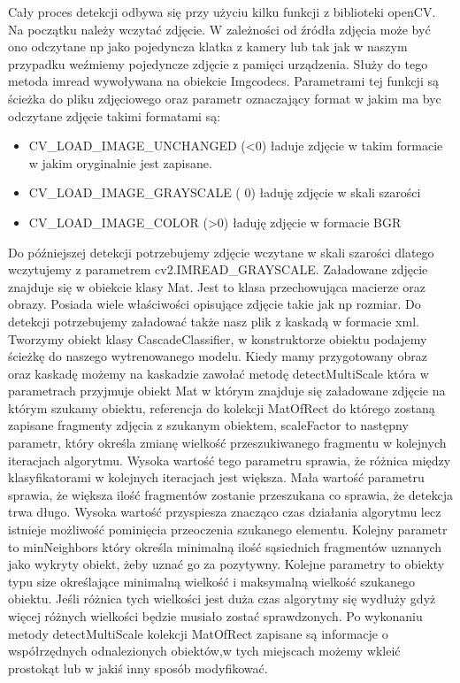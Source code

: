 \documentclass{article}
\numberwithin{equation}{section}
\begin{document}
Cały proces detekcji odbywa się przy użyciu kilku funkcji z biblioteki openCV. Na początku należy wczytać zdjęcie. W zależności od źródła zdjęcia może być ono odczytane np jako pojedyncza klatka z kamery lub tak jak w naszym przypadku weźmiemy pojedyncze zdjęcie z pamięci urządzenia. Służy do tego metoda imread wywoływana na obiekcie Imgcodecs. Parametrami tej funkcji są ścieżka do pliku zdjęciowego oraz parametr oznaczający format w jakim ma byc odczytane zdjęcie takimi formatami są:
\begin{itemize}
    \item CV\_LOAD\_IMAGE\_UNCHANGED (\textless0) ładuje zdjęcie w takim formacie w jakim oryginalnie jest zapisane.
    \item CV\_LOAD\_IMAGE\_GRAYSCALE ( 0) ładuję zdjęcie w skali szarości
    \item CV\_LOAD\_IMAGE\_COLOR (\textgreater0) ładuję zdjęcie w formacie BGR
\end{itemize}
Do późniejszej detekcji potrzebujemy zdjęcie wczytane w skali szarości dlatego wczytujemy z parametrem cv2.IMREAD\_GRAYSCALE.
Załadowane zdjęcie znajduje się w obiekcie klasy Mat. Jest to klasa przechowująca macierze oraz obrazy. Posiada wiele właściwości opisujące zdjęcie takie jak np rozmiar.
Do detekcji potrzebujemy załadować także nasz plik z kaskadą w formacie xml. Tworzymy obiekt klasy CascadeClassifier, w konstruktorze obiektu podajemy ścieżkę do naszego wytrenowanego modelu. Kiedy mamy przygotowany obraz oraz kaskadę możemy na kaskadzie zawołać metodę detectMultiScale która w parametrach przyjmuje obiekt Mat w którym znajduje się załadowane zdjęcie na którym szukamy obiektu, referencja do kolekcji MatOfRect do którego zostaną zapisane fragmenty zdjęcia z szukanym obiektem, scaleFactor to następny parametr, który określa zmianę wielkość przeszukiwanego fragmentu w kolejnych iteracjach algorytmu. Wysoka wartość tego parametru sprawia, że różnica między klasyfikatorami w kolejnych iteracjach jest większa. Mała wartość parametru sprawia, że większa ilość fragmentów zostanie przeszukana co sprawia, że detekcja trwa długo. Wysoka wartość przyspiesza znacząco czas działania algorytmu lecz istnieje możliwość pominięcia przeoczenia szukanego elementu. Kolejny parametr to minNeighbors który określa minimalną ilość sąsiednich fragmentów uznanych jako wykryty obiekt, żeby uznać go za pozytywny. Kolejne parametry to obiekty typu size określające minimalną wielkość i maksymalną wielkość szukanego obiektu. Jeśli różnica tych wielkości jest duża czas algorytmy się wydłuży gdyż więcej różnych wielkości będzie musiało zostać sprawdzonych. 
Po wykonaniu metody detectMultiScale kolekcji MatOfRect zapisane są informacje o współrzędnych odnalezionych obiektów,w tych miejscach możemy wkleić prostokąt lub w jakiś inny sposób modyfikować.
\end{document}
